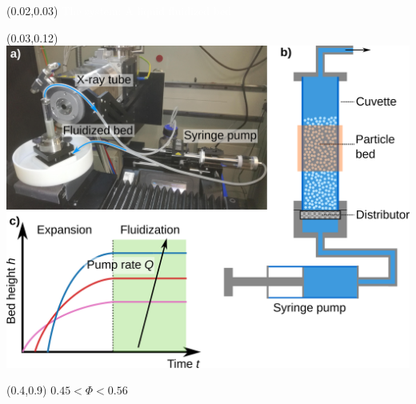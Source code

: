 \begin{frame}[noframenumbering]

\begin{textblock}{0.6}(0.02,0.03)
	\textcolor{white}{
		\Large The system: A liquid fluidized bed}
\end{textblock}

\begin{textblock}{0.6}(0.03,0.12)
	\includegraphics[width=\textwidth]{Sources/X-DFA/experiment-fluidized_bed_1.pdf}
\end{textblock}

\begin{textblock}{0.6}(0.4,0.9)
	$0.45 < \Phi < 0.56$
\end{textblock}



\end{frame}
